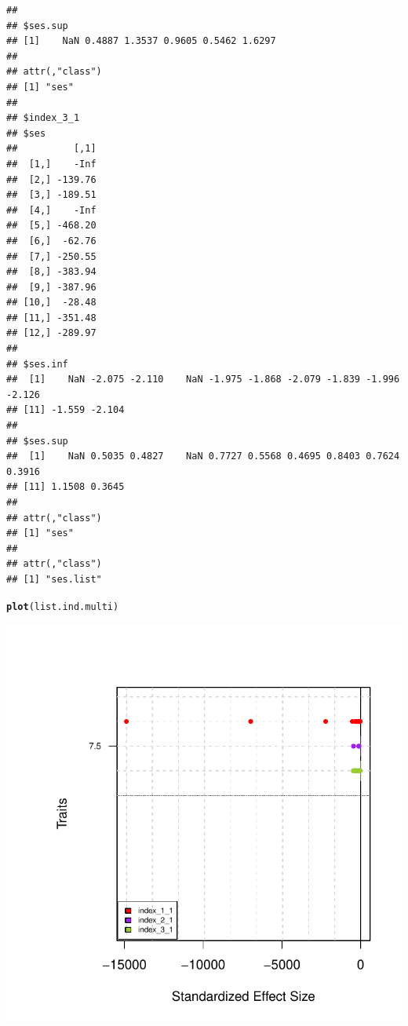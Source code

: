 \documentclass[12pt]{article}\usepackage[]{graphicx}\usepackage[]{color}
\makeatletter
\def\maxwidth{ %
  \ifdim\Gin@nat@width>\linewidth
    \linewidth
  \else
    \Gin@nat@width
  \fi
}
\newcommand{\hlstd}[1]{\textcolor[rgb]{0.345,0.345,0.345}{#1}}%
\newcommand{\hlkwd}[1]{\textcolor[rgb]{0.737,0.353,0.396}{\textbf{#1}}}%
\newenvironment{kframe}{%
 \def\at@end@of@kframe{}%
 \ifinner\ifhmode%
  \def\at@end@of@kframe{\end{minipage}}%
  \begin{minipage}{\columnwidth}%
 \fi\fi%
 \def\FrameCommand##1{\hskip\@totalleftmargin \hskip-\fboxsep
 \colorbox{shadecolor}{##1}\hskip-\fboxsep
     \hskip-\linewidth \hskip-\@totalleftmargin \hskip\columnwidth}%
 \MakeFramed {\advance\hsize-\width
   \@totalleftmargin\z@ \linewidth\hsize
   \@setminipage}}%
 {\par\unskip\endMakeFramed%
 \at@end@of@kframe}
\newenvironment{knitrout}{}{} %
\makeatother
\begin{document}
\begin{knitrout}
\begin{kframe}
\begin{verbatim}
## 
## $ses.sup
## [1]    NaN 0.4887 1.3537 0.9605 0.5462 1.6297
## 
## attr(,"class")
## [1] "ses"
## 
## $index_3_1
## $ses
##          [,1]
##  [1,]    -Inf
##  [2,] -139.76
##  [3,] -189.51
##  [4,]    -Inf
##  [5,] -468.20
##  [6,]  -62.76
##  [7,] -250.55
##  [8,] -383.94
##  [9,] -387.96
## [10,]  -28.48
## [11,] -351.48
## [12,] -289.97
## 
## $ses.inf
##  [1]    NaN -2.075 -2.110    NaN -1.975 -1.868 -2.079 -1.839 -1.996 -2.126
## [11] -1.559 -2.104
## 
## $ses.sup
##  [1]    NaN 0.5035 0.4827    NaN 0.7727 0.5568 0.4695 0.8403 0.7624 0.3916
## [11] 1.1508 0.3645
## 
## attr(,"class")
## [1] "ses"
## 
## attr(,"class")
## [1] "ses.list"
\end{verbatim}
\end{kframe}
\end{knitrout}

\begin{knitrout}
\color{fgcolor}\begin{kframe}
\begin{alltt}
\hlkwd{plot}\hlstd{(list.ind.multi)}
\end{alltt}
\end{kframe}

{\centering \includegraphics[width=\maxwidth]{figure/unnamed-chunk-591} 

}
\end{knitrout}
\end{document}
